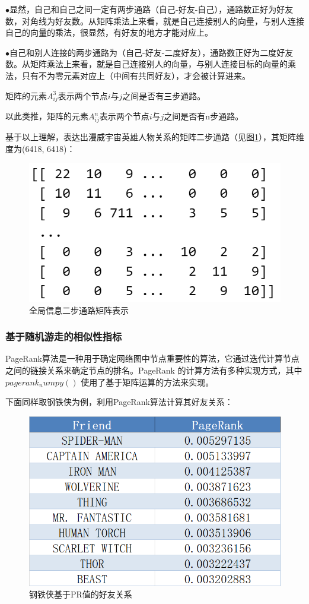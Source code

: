\documentclass[12pt]{xjtureport}
\begin{document}
$\bullet$显然，自己和自己之间一定有两步通路（自己-好友-自己），通路数正好为好友数，对角线为好友数。从矩阵乘法上来看，就是自己连接别人的向量，与别人连接自己的向量的乘法，很显然，有好友的地方才能对应上。

$\bullet$自己和别人连接的两步通路为（自己-好友-二度好友），通路数正好为二度好友数。从矩阵乘法上来看，就是自己连接别人的向量，与别人连接目标的向量的乘法，只有不为零元素对应上（中间有共同好友），才会被计算进来。

矩阵的元素$A_{ij}^{3}$表示两个节点$i$与$j$之间是否有三步通路。

以此类推，矩阵的元素$A_{ij}^{n}$表示两个节点$i$与$j$之间是否有n步通路。

基于以上理解，表达出漫威宇宙英雄人物关系的矩阵二步通路（见图\ref{222}），其矩阵维度为(6418, 6418)：

\begin{figure}[!htbp]
    \centering
    \includegraphics[width=0.4\linewidth]{figures/全局信息表示.jpg}
    \caption{全局信息二步通路矩阵表示}
    \label{222}
\end{figure}

\subsubsection{基于随机游走的相似性指标}

PageRank算法是一种用于确定网络图中节点重要性的算法，它通过迭代计算节点之间的链接关系来确定节点的排名。PageRank 的计算方法有多种实现方式，其中 $pagerank_numpy()$ 使用了基于矩阵运算的方法来实现。

下面同样取钢铁侠为例，利用PageRank算法计算其好友关系：

\begin{figure}[!htbp]
    \centering
    \includegraphics[width=0.5\linewidth]{figures/钢铁侠推荐好友2.jpg}
    \caption{钢铁侠基于PR值的好友关系}
    \label{friend2}
\end{figure}
\end{document}
